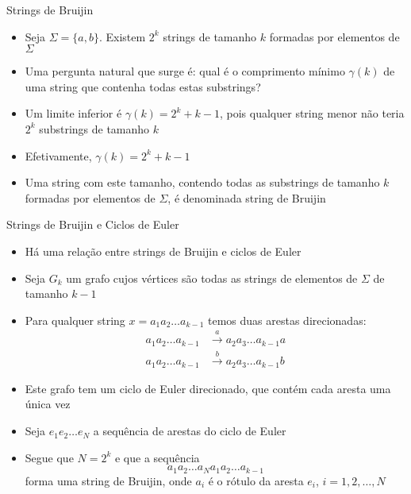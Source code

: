 \begin{frame}[fragile]{Strings de Bruijin}

    \begin{itemize}
        \item Seja $\Sigma = \lbrace a, b\rbrace$. Existem $2^k$ strings de tamanho $k$ formadas por 
            elementos de $\Sigma$
        \pause

        \item Uma pergunta natural que surge é: qual é o comprimento mínimo $\gamma(k)$ de uma 
            string que contenha todas estas substrings?
        \pause

        \item Um limite inferior é $\gamma(k) = 2^k + k - 1$, pois qualquer string menor não teria 
            $2^k$ substrings de tamanho $k$
        \pause

        \item Efetivamente, $\gamma(k) = 2^k + k - 1$
        \pause

        \item Uma string com este tamanho, contendo todas as substrings de tamanho $k$ formadas 
            por elementos de $\Sigma$, é denominada string de Bruijin

    \end{itemize}

\end{frame}

\begin{frame}[fragile]{Strings de Bruijin e Ciclos de Euler}

    \begin{itemize}
        \item Há uma relação entre strings de Bruijin e ciclos de Euler
        \pause

        \item Seja $G_k$ um grafo cujos vértices são todas as strings de elementos de $\Sigma$ de 
            tamanho $k - 1$
        \pause

        \item Para qualquer string $x = a_1a_2\ldots a_{k-1}$ temos duas arestas direcionadas:
            \begin{align*}
                a_1a_2\ldots a_{k-1} &\xrightarrow{\ a\ } a_2a_3\ldots a_{k-1}a \\
                a_1a_2\ldots a_{k-1} &\xrightarrow{\ b\ } a_2a_3\ldots a_{k-1}b
            \end{align*}
        \pause

        \item Este grafo tem um ciclo de Euler direcionado, que contém cada aresta uma única vez
        \pause

        \item Seja $e_1e_2\ldots e_N$ a sequência de arestas do ciclo de Euler
        \pause

        \item Segue que $N = 2^k$ e que a sequência 
        \[
            a_1a_2\ldots a_Na_1a_2\ldots a_{k-1}
        \]
        forma uma string de Bruijin, onde $a_i$ é o rótulo da aresta $e_i$, $i = 1, 2, \ldots, N$ 
   \end{itemize}

\end{frame}
